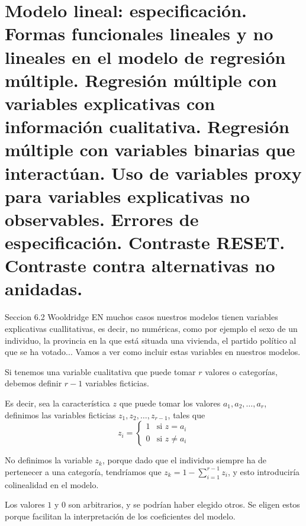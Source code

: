 
\chapter[Modelo lineal: especificaci\'on.]{Modelo lineal: especificaci\'on. \\
\normalsize  Formas funcionales lineales y no lineales en el modelo de regresi\'on m\'ultiple. Regresi\'on m\'ultiple con variables explicativas con informaci\'on cualitativa. Regresi\'on m\'ultiple con variables binarias que interact\'uan. Uso de variables proxy para variables explicativas no observables. Errores de especificaci\'on. Contraste RESET. Contraste contra alternativas no anidadas.}






Seccion 6.2 Wooldridge
EN muchos casos nuestros modelos tienen variables explicativas cuallitativas, es decir, no num\'ericas, como por ejemplo el sexo de un individuo, la provincia en la que est\'a situada una vivienda, el partido pol\'itico al que se ha votado... Vamos a ver como incluir estas variables en nuestros modelos.


Si tenemos una variable cualitativa que puede tomar $r$ valores o categor\'ias, debemos definir $r-1$ variables ficticias.

Es decir, sea la caracter\'istica $z$ que puede tomar los valores $a_1, a_2,\ldots,a_r$, definimos las variables ficticias $z_1, z_2,\ldots,z_{r-1}$, tales que 
\[z_i=\left\{\begin{array}{ll}
1 & \text{si } z=a_i \\
0 & \text{si } z\neq a_i 
\end{array}\right.\]

No definimos la variable $z_k$, porque dado que el individuo siempre ha de pertenecer a una categor\'ia, tendr\'iamos que $z_k=1-\sum_{i=1}^{r-1}z_i$, y esto introducir\'ia colinealidad en el modelo.

Los valores $1$ y $0$ son arbitrarios, y se podr\'ian haber elegido otros. Se eligen estos porque facilitan la interpretaci\'on de los coeficientes del modelo.

